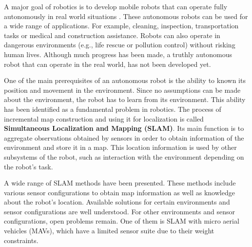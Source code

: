 A major goal of robotics is to develop mobile robots that can operate fully autonomously in real world situations \cite{murphy2000introduction}.
These autonomous robots can be used for a wide range of applications.
For example, cleaning, inspection, transportation tasks or medical and construction assistance.
Robots can also operate in dangerous environments (e.g., life rescue or pollution control) without risking human lives.
Although much progress has been made, a truthly autonomous robot that can operate in the real world, has not been developed yet.

One of the main prerequisites of an autonomous robot is the ability to known its position and movement in the environment.
Since no assumptions can be made about the environment, the robot has to learn from its environment.
This ability has been identified as a fundamental problem in robotics.
The process of incremental map construction and using it for localization is called \textbf{Simultaneous Localization and Mapping (SLAM)}.
Its main function is to aggregate observations obtained by sensors in order to obtain information of the environment and store it in a map.
This location information is used by other subsystems of the robot, such as interaction with the environment depending on the robot's task.

A wide range of SLAM methods have been presented.
These methods include various sensor configurations to obtain map information as well as knowledge about the robot's location.
Available solutions for certain environments and sensor configurations are well understood.
For other environments and sensor configurations, open problems remain.
One of them is SLAM with micro aerial vehicles (MAVs), which have a limited sensor suite due to their weight constraints.

